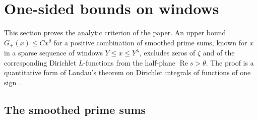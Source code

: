 \section{One-sided bounds on windows}\label{sec:criterion}

This section proves the analytic criterion of the paper. An upper bound $G_+(x)\le Cx^\theta$ for a positive combination of smoothed prime sums, known for $x$ in a sparse sequence of windows $Y\le x\le Y^\lambda$, excludes zeros of $\zeta$ and of the corresponding Dirichlet $L$-functions from the half-plane $\operatorname{Re}s>\theta$. The proof is a quantitative form of Landau's theorem on Dirichlet integrals of functions of one sign~\cite{landau}.

\subsection{The smoothed prime sums}\label{sec:functions}

